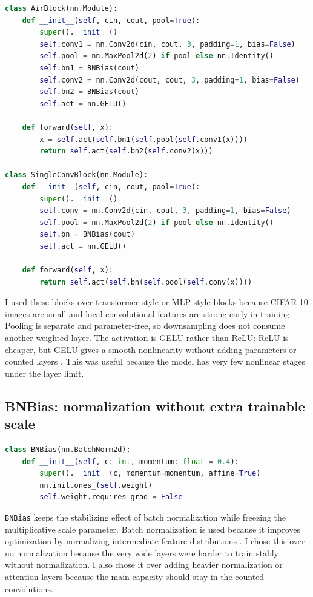 \documentclass[11pt]{article}
\begin{document}
\begin{lstlisting}[language=Python,caption={Main trunk blocks}]
class AirBlock(nn.Module):
    def __init__(self, cin, cout, pool=True):
        super().__init__()
        self.conv1 = nn.Conv2d(cin, cout, 3, padding=1, bias=False)
        self.pool = nn.MaxPool2d(2) if pool else nn.Identity()
        self.bn1 = BNBias(cout)
        self.conv2 = nn.Conv2d(cout, cout, 3, padding=1, bias=False)
        self.bn2 = BNBias(cout)
        self.act = nn.GELU()

    def forward(self, x):
        x = self.act(self.bn1(self.pool(self.conv1(x))))
        return self.act(self.bn2(self.conv2(x)))

class SingleConvBlock(nn.Module):
    def __init__(self, cin, cout, pool=True):
        super().__init__()
        self.conv = nn.Conv2d(cin, cout, 3, padding=1, bias=False)
        self.pool = nn.MaxPool2d(2) if pool else nn.Identity()
        self.bn = BNBias(cout)
        self.act = nn.GELU()

    def forward(self, x):
        return self.act(self.bn(self.pool(self.conv(x))))
\end{lstlisting}

I used these blocks over transformer-style or MLP-style blocks because CIFAR-10 images
are small and local convolutional features are strong early in training. Pooling is
separate and parameter-free, so downsampling does not consume another weighted layer.
The activation is GELU rather than ReLU: ReLU is cheaper, but GELU gives a smooth
nonlinearity without adding parameters or counted layers \cite{hendrycks2016gelu}. This
was useful because the model has very few nonlinear stages under the layer limit.

\subsection{BNBias: normalization without extra trainable scale}

\begin{lstlisting}[language=Python,caption={Frozen-scale batch normalization}]
class BNBias(nn.BatchNorm2d):
    def __init__(self, c: int, momentum: float = 0.4):
        super().__init__(c, momentum=momentum, affine=True)
        nn.init.ones_(self.weight)
        self.weight.requires_grad = False
\end{lstlisting}

\texttt{BNBias} keeps the stabilizing effect of batch normalization while freezing the
multiplicative scale parameter. Batch normalization is used because it improves
optimization by normalizing intermediate feature distributions \cite{ioffe2015batchnorm}.
I chose this over no normalization because the very wide layers were harder to train
stably without normalization. I also chose it over adding heavier normalization or
attention layers because the main capacity should stay in the counted convolutions.
\end{document}
